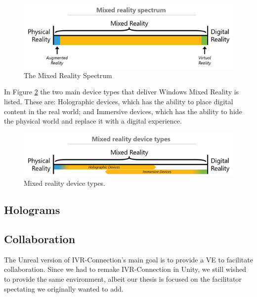         \begin{figure}[!ht]
            \centering
            \includegraphics[scale=1]{figures/mixedrealityspectrum.png}
            \caption{The Mixed Reality Spectrum\cite{wdc-mr}}
            \label{fig:mrspectrum}
        \end{figure}
        
        In Figure \ref{fig:mrdevicetypes} the two main device types that deliver Windows Mixed Reality is listed. These are: Holographic devices, which has the ability to place digital content in the real world;\cite{wdc-mr} and Immersive devices, which has the ability to hide the physical world and replace it with a digital experience.\cite{wdc-mr} 
        \begin{figure}[!ht]
            \centering
            \includegraphics[scale=1]{figures/mixedrealityspectrumdevicetypes.png}
            \caption{Mixed reality device types.\cite{wdc-mr}}
            \label{fig:mrdevicetypes}
        \end{figure}
        
        \subsection{Holograms}
        
        \subsection{Collaboration}
            The Unreal version of IVR-Connection's main goal is to provide a VE to facilitate collaboration. Since we had to remake IVR-Connection in Unity, we still wished to provide the same environment, albeit our thesis is focused on the facilitator spectating we originally wanted to add.
            
